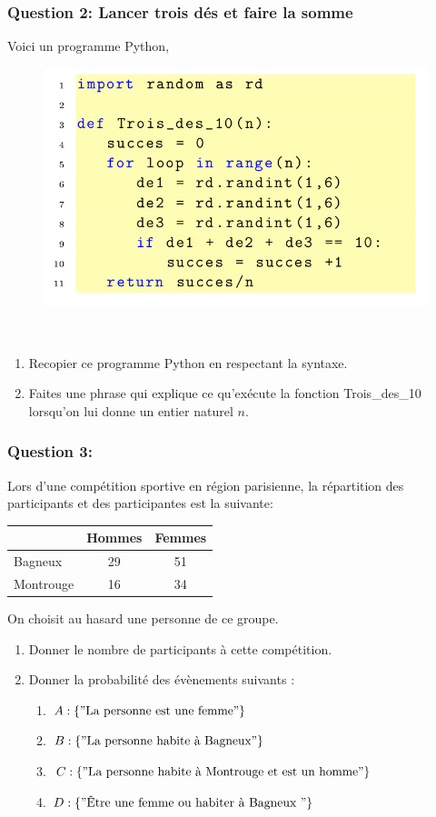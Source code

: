 \documentclass[t,12pt]{beamer}
\begin{document}
\begin{frame}
	\frametitle{Question 2: Lancer trois dés et faire la somme}
	Voici un programme Python, 
	\begin{figure}
		\includegraphics[scale=0.3]{1.png}
	\end{figure}\hfill\\[-0.4cm]
	\begin{enumerate}
		\item Recopier ce programme Python en respectant la syntaxe. 
		\item Faites une phrase qui explique ce qu'exécute la fonction Trois\_des\_10 lorsqu'on lui donne un entier naturel $n$.	
	\end{enumerate}
\end{frame}
	
\begin{frame}
	\frametitle{Question 3: }
	
	Lors d'une compétition sportive en région parisienne, la répartition des participants et des participantes est la suivante:
	\begin{center}
		\begin{tabular}{|l|c|c|}
			\cline{2-3}
			\multicolumn{1}{c|}{} & Hommes & Femmes \\
			\hline
			Bagneux  &  29 &  51\\ \hline
			Montrouge & 16 & 34\\
			\hline 
		\end{tabular}
	\end{center}
	On choisit au hasard une personne de ce groupe. 	
	\begin{enumerate}
		\item Donner le nombre de participants à cette compétition.
		\item Donner la probabilité des évènements suivants :
		\begin{enumerate}[$\square$]
			\item $A:\{"\text{La personne est une femme}"\}$ 
			\item $B:\{"\text{La personne habite à Bagneux}"\}$ 
			\item $C:\{"\text{La personne  habite à Montrouge et est un homme}"\}$
			\item $D:\{"\text{Être une femme ou habiter à Bagneux }"\}$  	
		\end{enumerate}
	\end{enumerate}	
\end{frame}
\end{document}
